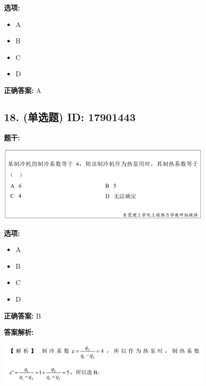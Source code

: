 \documentclass[12pt]{article}
\begin{document}
\textbf{选项:}
\begin{itemize}[leftmargin=*]
  \item A

  \item B

  \item C

  \item D

\end{itemize}

\textbf{正确答案:}
A

\vspace{0.5em}\hrulefill\vspace{1em}

\subsection*{18. (单选题) \small ID: 17901443}

\textbf{题干:}


\begin{center}\includegraphics[width=0.8\textwidth, height=0.25\textheight, keepaspectratio]{question_18_17901443/title_img_1.png}\end{center}

\textbf{选项:}
\begin{itemize}[leftmargin=*]
  \item A

  \item B

  \item C

  \item D

\end{itemize}

\textbf{正确答案:}
B

\textbf{答案解析:}


\begin{center}\includegraphics[width=0.8\textwidth, height=0.25\textheight, keepaspectratio]{question_18_17901443/correct_replay_img_1.png}\end{center}
\end{document}
